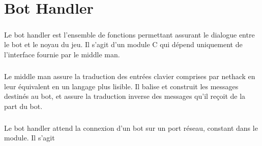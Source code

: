 \chapter{Bot Handler}

\paragraph{}
Le bot handler est l'ensemble de fonctions permettant assurant le dialogue
entre le bot et le noyau du jeu. Il s'agit d'un module C qui dépend uniquement de
l'interface fournie par le middle man.

\paragraph{}
Le middle man assure la traduction des entrées clavier comprises par nethack en 
leur équivalent en un langage plus lisible. Il balise et construit les messages destinés
au bot, et assure la traduction inverse des messages qu'il reçoit de la part du bot.

\paragraph{}
Le bot handler attend la connexion d'un bot sur un port réseau, constant dans le module.
Il s'agit 
